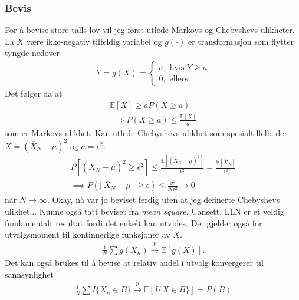 \subsubsection{Bevis}
For å bevise store talls lov vil jeg først utlede Markovs og Chebyshevs ulikheter. La $X$ være ikke-negativ tilfeldig variabel og $g(\cdot)$ er transformasjon som flytter tyngde nedover
\begin{align}
Y = g(X) = 
\begin{cases}
a, \text{ hvis } Y \geq a \\
0, \text{ ellers}
\end{cases}
\end{align}
Det følger da at
\begin{align}
\mathbb{E}[X] \geq aP(X\geq a) \\
\implies P(X\geq a)\leq \frac{\mathbb{E}[X]}{a}
\end{align}
som er Markovs ulikhet. Kan utlede Chebyshevs ulikhet som spesialtilfelle der $X = (\bar{X}_N-\mu)^2$ og $a=\epsilon^2$. 
\begin{align}
P[(\bar{X}_N - \mu)^2 \geq \epsilon^2]\leq \frac{\mathbb{E}[(\bar{X}_N - \mu)^2]}{\epsilon^2}=\frac{\mathbb{V}[\bar{X}_N]}{\epsilon^2} \\
\implies P(\lvert\ \bar{X}_N - \mu \rvert\ \geq \epsilon) \leq \frac{\sigma^2}{N\epsilon^2} \rightarrow 0
\end{align}
når $N \rightarrow \infty$. Okay, nå var jo beviset ferdig uten at jeg definerte Chebyshevs ulikhet... Kunne også tatt beviset fra \textit{mean square}. Uansett, LLN er et veldig fundamentalt resultat fordi det enkelt kan utvides. Det gjelder også for utvalgsmoment til kontinuerlige funksjoner av $X$.
\begin{align}
\frac{1}{N}\sum g(X_n) \overset{p}{\rightarrow} \mathbb{E}[g(X)].
\end{align}
Det kan også brukes til å bevise at relativ andel i utvalg konvergerer til sannsynlighet
\begin{align}
\frac{1}{N}\sum I\{X_n \in B\} \overset{p}{\rightarrow} \mathbb{E}[I\{X \in B \}] = P(B)
\end{align}
